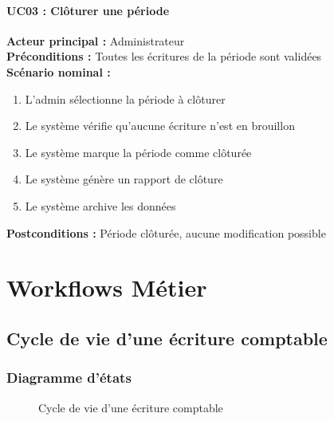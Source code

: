\documentclass[12pt]{report}
\begin{document}
\subsubsection{UC03 : Clôturer une période}
\begin{tcolorbox}[colframe=bleuciel, colback=bleuciel!5, boxrule=1pt, arc=4pt]
\textbf{Acteur principal :} Administrateur \\
\textbf{Préconditions :} Toutes les écritures de la période sont validées \\
\textbf{Scénario nominal :}
\begin{enumerate}
    \item L'admin sélectionne la période à clôturer
    \item Le système vérifie qu'aucune écriture n'est en brouillon
    \item Le système marque la période comme clôturée
    \item Le système génère un rapport de clôture
    \item Le système archive les données
\end{enumerate}
\textbf{Postconditions :} Période clôturée, aucune modification possible
\end{tcolorbox}


\chapter{Workflows Métier}

\section{Cycle de vie d'une écriture comptable}

\subsection{Diagramme d'états}
\begin{figure}[H]
\centering
{}
\caption{Cycle de vie d'une écriture comptable}
\label{fig:etat_ecriture}
\end{figure}
\end{document}
